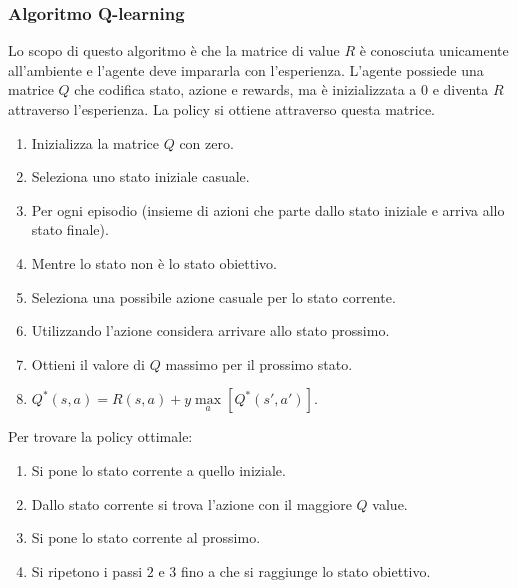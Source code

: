 		\subsubsection{Algoritmo Q-learning}
		Lo scopo di questo algoritmo \`e che la matrice di value $R$ \`e conosciuta unicamente all'ambiente e l'agente deve impararla con l'esperienza.
		L'agente possiede una matrice $Q$ che codifica stato, azione e rewards, ma \`e inizializzata a $0$ e diventa $R$ attraverso l'esperienza.
		La policy si ottiene attraverso questa matrice.
		\begin{enumerate}
			\item Inizializza la matrice $Q$ con zero.
			\item Seleziona uno stato iniziale casuale.
			\item Per ogni episodio (insieme di azioni che parte dallo stato iniziale e arriva allo stato finale).
			\item Mentre lo stato non \`e lo stato obiettivo.
			\item Seleziona una possibile azione casuale per lo stato corrente.
			\item Utilizzando l'azione considera arrivare allo stato prossimo.
			\item Ottieni il valore di $Q$ massimo per il prossimo stato.
			\item $Q^*(s,a) = R(s,a)+y\max\limits_a[Q^*(s',a')]$.
		\end{enumerate}
		Per trovare la policy ottimale:
		\begin{enumerate}
			\item Si pone lo stato corrente a quello iniziale.
			\item Dallo stato corrente si trova l'azione con il maggiore $Q$ value.
			\item Si pone lo stato corrente al prossimo.
			\item Si ripetono i passi $2$ e $3$ fino a che si raggiunge lo stato obiettivo.
		\end{enumerate}

